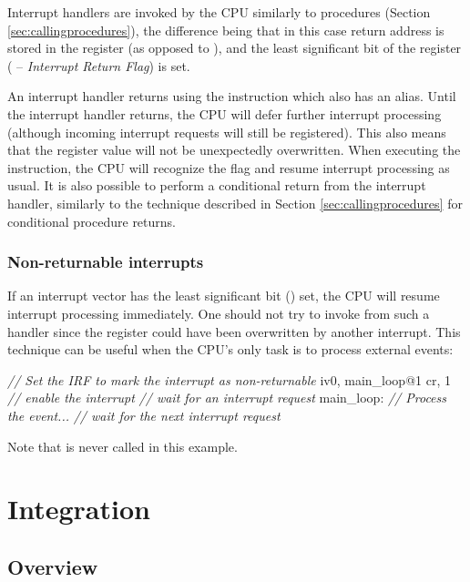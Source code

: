 \documentclass[a4paper,12pt,twoside,extrafontsizes]{memoir}
\begin{document}
Interrupt handlers are invoked by the CPU similarly to procedures (Section \ref{sec:callingprocedures}), the difference being that in this case return address is stored in the  register (as opposed to ), and the least significant bit of the register ( -- \emph{Interrupt Return Flag}) is set.

An interrupt handler returns using the  instruction which also has an  alias. Until the interrupt handler returns, the CPU will defer further interrupt processing (although incoming interrupt requests will still be registered). This also means that the  register value will not be unexpectedly overwritten. When executing the  instruction, the CPU will recognize the  flag and resume interrupt processing as usual. It is also possible to perform a conditional return from the interrupt handler, similarly to the technique described in Section \ref{sec:callingprocedures} for conditional procedure returns.

\subsection{Non-returnable interrupts}

If an interrupt vector has the least significant bit () set, the CPU will resume interrupt processing immediately. One should not try to invoke  from such a handler since the  register could have been overwritten by another interrupt. This technique can be useful when the CPU's only task is to process external events:

\begin{codeparbreakable}
\emph{// Set the IRF to mark the interrupt as non-returnable}
     iv0, main\_loop@1
     cr, 1 \emph{// enable the interrupt}
     \emph{// wait for an interrupt request}
main\_loop:
\emph{// Process the event...}
     \emph{// wait for the next interrupt request}
\end{codeparbreakable}

Note that  is never called in this example.

\chapter{Integration}
\label{ch:integration}

\section{Overview}
\end{document}
